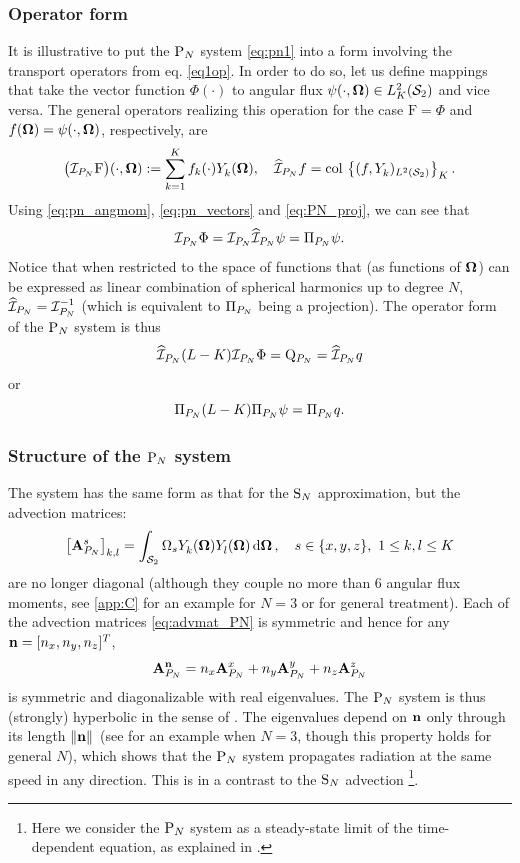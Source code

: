 \subsubsection{Operator form} \label{sec:pn_op}
It is illustrative to put the $\PN$ system \eqref{eq:pn1} into a form involving the transport operators from
eq. \eqref{eq1op}.
In order to do so, let us define mappings that take the vector function $\Phi(\cdot)$ to angular
flux $\psi(\cdot,\bomega)\in\Lp[2]_K(\Sphere)$ and vice versa. The general operators realizing this operation for the
case $\mathrm{F} = \Phi$ and $f(\bomega) = \psi(\cdot,\bomega)$, respectively, are
\begin{equation}\label{eq:pn_op_def}
\bigl(\PiPN\mathrm{F}\bigr)(\cdot,\bomega) := \sum_{k=1}^{ K} f_k(\cdot)\Y{k}{}(\bomega), \quad
\PihPN f = \col \left\{(f, \Y{k}{})_{\Lp[2](\Sphere)}\right\}_{\idxset{K}}.
\end{equation} 
Using \eqref{eq:pn_angmom}, \eqref{eq:pn_vectors} and \eqref{eq:PN_proj}, we can see that 
$$
\PiPN\Phi = \PiPN\PihPN \psi = \Projop\psi.
$$ 
Notice that when restricted to the space of functions that (as functions of 
$\bomega$) can be expressed as linear combination of spherical harmonics up to degree $N$, $\PihPN = \PiPN^{-1}$  (which
is equivalent to $\Projop[P_N]$ being a projection). 
The operator form of the $\PN$ system is thus
\begin{equation}\label{eq:pn_op}
	\PihPN (L-K) \PiPN\Phi = \mathrm{Q}_{P_N} = \PihPN q
\end{equation}
or
\begin{equation}\label{eq:pn_op2}
	\Projop (L-K) \Projop\psi = \Projop q.
\end{equation}

\subsubsection{Structure of the $\PN$ system}
The system has the same form as that for the $\SN$ approximation, but the advection matrices:
\begin{equation}\label{eq:advmat_PN}
	\left[\mat{A}_{P_N}^s\right]_{k,l} = \intA{\Omega_s \Y{k}{}(\bomega)\Yc{l}{}(\bomega)},\quad s\in\{x,y,z\},\ 
	1 \leq k,l \leq  K
\end{equation}
are no longer diagonal (although they couple no more than 6 angular flux moments, see \ref{app:C} for an example for $N
= 3$ or \cite[App. A]{Sanchez8} for general treatment). Each of the advection matrices \eqref{eq:advmat_PN} 
is symmetric and hence for any $\bn = [n_x,n_y,n_z]^T$, 
$$
	\mat{A}_{P_N}^{\bn} = n_x \mat{A}_{P_N}^x + n_y \mat{A}_{P_N}^y + n_z \mat{A}_{P_N}^z
$$
is symmetric and diagonalizable with real eigenvalues. The $\PN$ system is thus (strongly) hyperbolic in the sense of 
\cite[Def. 18.1]{leveque}. The eigenvalues depend on 
$\bn$ only through its length $\norm{\bn}$ (see  for an example when $N = 3$,  though this property
holds for general $N$), which shows that the $\PN$ system propagates radiation at the same speed in any
direction. This is in a contrast to the $\SN$ advection \footnote{Here we consider the $\PN$ system as a steady-state
limit of the time-dependent equation, as explained in \sref{app:C}.}.

